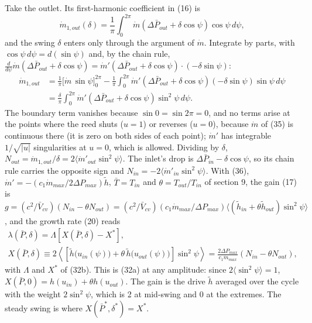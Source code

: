 \documentclass[11pt]{article}
\begin{document}
Take the outlet. Its first-harmonic coefficient in (16) is
\begin{equation}
\dot m_{1,out}(\delta) = \frac{1}{\pi}\int_0^{2\pi}\dot m\left(\Delta\bar P_{out} + \delta\cos\psi\right)\cos\psi\,d\psi , \tag{37a}
\end{equation}
and the swing $\delta$ enters only through the argument of $\dot m$. Integrate by parts, with $\cos\psi\,d\psi = d(\sin\psi)$ and, by the chain rule, $\frac{d}{d\psi}\dot m(\Delta\bar P_{out} + \delta\cos\psi) = \dot m'(\Delta\bar P_{out} + \delta\cos\psi)\cdot(-\delta\sin\psi)$:
\[
\begin{aligned}
\dot m_{1,out} &= \frac{1}{\pi}\Big[\dot m\,\sin\psi\Big]_0^{2\pi} - \frac{1}{\pi}\int_0^{2\pi}\dot m'\left(\Delta\bar P_{out} + \delta\cos\psi\right)(-\delta\sin\psi)\sin\psi\,d\psi \\
&= \frac{\delta}{\pi}\int_0^{2\pi}\dot m'\left(\Delta\bar P_{out} + \delta\cos\psi\right)\sin^2\psi\,d\psi .
\end{aligned}
\]
The boundary term vanishes because $\sin 0 = \sin 2\pi = 0$, and no terms arise at the points where the reed shuts ($u = 1$) or reverses ($u = 0$), because $\dot m$ of (35) is continuous there (it is zero on both sides of each point); $\dot m'$ has integrable $1/\sqrt{\lvert u\rvert}$ singularities at $u = 0$, which is allowed. Dividing by $\delta$, $N_{out} = \dot m_{1,out}/\delta = 2\langle\dot m'_{out}\sin^2\psi\rangle$. The inlet's drop is $\Delta\bar P_{in} - \delta\cos\psi$, so its chain rule carries the opposite sign and $N_{in} = -2\langle\dot m'_{in}\sin^2\psi\rangle$. With (36), $\dot m' = -(c_1\dot m_{max}/2\Delta P_{max})\tilde h$, $\bar T = T_{in}$ and $\theta = T_{out}/T_{in}$ of section 9, the gain (17) is $g = (c^2/\bar V_{cv})(N_{in} - \theta N_{out}) = (c^2/\bar V_{cv})(c_1\dot m_{max}/\Delta P_{max})\langle(\tilde h_{in} + \theta\tilde h_{out})\sin^2\psi\rangle$, and the growth rate (20) reads
\begin{equation}
\begin{gathered}
\lambda(\bar P,\delta) = \Lambda\left[X(\bar P,\delta) - X^*\right], \\
X(\bar P,\delta) \equiv 2\left\langle\left[\tilde h\big(u_{in}(\psi)\big) + \theta\,\tilde h\big(u_{out}(\psi)\big)\right]\sin^2\psi\right\rangle = \frac{2\Delta P_{max}}{c_1\dot m_{max}}\left(N_{in} - \theta N_{out}\right),
\end{gathered} \tag{37}
\end{equation}
with $\Lambda$ and $X^*$ of (32b). This is (32a) at any amplitude: since $2\langle\sin^2\psi\rangle = 1$, $X(\bar P, 0) = h(u_{in}) + \theta h(u_{out})$. The gain is the drive $\tilde h$ averaged over the cycle with the weight $2\sin^2\psi$, which is 2 at mid-swing and 0 at the extremes. The steady swing is where $X(\bar P^*, \delta^*) = X^*$.
\end{document}
